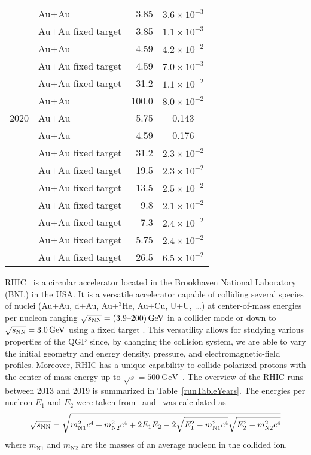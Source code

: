 \begin{table}[!p]
\begin{center}
\begin{spacing}{1.0}
\begin{tabular}{llD{.}{.}{3.1}c}
       & Au+Au & 3.85 & $3.6\times 10^{-3}$\\
       & Au+Au fixed target& 3.85 & $1.1\times 10^{-3}$\\
       & Au+Au & 4.59 & $4.2\times 10^{-2}$\\
       & Au+Au fixed target& 4.59 & $7.0\times 10^{-3}$\\
       & Au+Au fixed target& 31.2 & $1.1\times 10^{-2}$\\
       & Au+Au & 100.0 & $8.0\times 10^{-2}$\\
 2020 & Au+Au & 5.75 & 0.143\\
       & Au+Au & 4.59 & 0.176\\
       &  Au+Au fixed target& 31.2 & $2.3\times 10^{-2}$\\
       &  Au+Au fixed target& 19.5 & $2.3\times 10^{-2}$\\
       &  Au+Au fixed target& 13.5 & $2.5\times 10^{-2}$\\
       &  Au+Au fixed target& 9.8  & $2.1\times 10^{-2}$\\
       &  Au+Au fixed target& 7.3  & $2.4\times 10^{-2}$\\
       &  Au+Au fixed target& 5.75 & $2.4\times 10^{-2}$\\
       &  Au+Au fixed target& 26.5 & $6.5\times 10^{-2}$\\
\bottomrule
\end{tabular}
\end{spacing}
\renewcommand{\arraystretch}{1.5}
\end{center}
\end{table} 
%
RHIC~\cite{RHICproject, RHICdesign} is a circular accelerator located in the Brookhaven National Laboratory 
(BNL) in the USA\@. It is a versatile accelerator capable of
colliding several species of nuclei (Au+Au, d+Au, Au+$^3$He, Au+Cu, U+U,~\dots) at
center-of-mass energies per nucleon
ranging $\sqrt{s_\text{NN}} = (\text{3.9--200})\,\si{\giga\electronvolt}$ in a collider mode or down to
$\sqrt{s_\text{NN}} = 3.0\,\si{\giga\electronvolt}$
using a fixed target \cite{fixedTarget}\@. This versatility allows for studying various properties of the QGP since, by changing the collision system, we are able to vary the initial geometry and energy density, pressure, and electromagnetic-field profiles. Moreover, RHIC has a unique capability to collide polarized protons with
the center-of-mass energy up to $\sqrt{s} = \SI{500}{\giga\electronvolt}$~\cite{polarizedProtons}\@. The overview
of the RHIC runs between 2013 and 2019 is summarized in Table~\ref{runTableYears}\@. The energies per nucleon $E_1$ and $E_2$ were taken from~\cite{RHICrunsTable} and \snn\ was calculated as
\begin{equation}
 \sqrt{s_\text{NN}} = \sqrt{m_\mathrm{N1}^2c^4 + m_\mathrm{N2}^2c^4 + 2E_1E_2 - 2\sqrt{E_1^2-m_\mathrm{N1}^2c^4}\sqrt{E_2^2-m_\mathrm{N2}^2c^4}}
\end{equation}
where $m_\mathrm{N1}$ and $m_\mathrm{N2}$ are the masses of an average nucleon in the collided ion.


